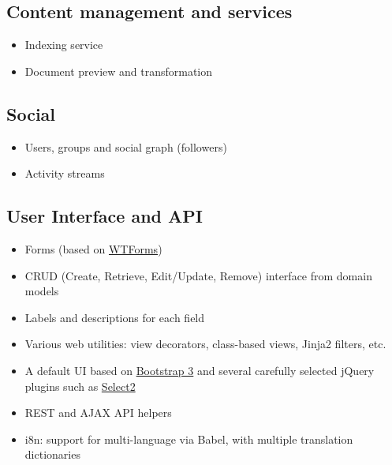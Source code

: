 \documentclass[a4paper,12pt,english]{sphinxmanual}
\begin{document}
\subsection{Content management and services}
\label{introduction:content-management-and-services}\begin{itemize}
\item {} 
Indexing service

\item {} 
Document preview and transformation

\end{itemize}


\subsection{Social}
\label{introduction:social}\begin{itemize}
\item {} 
Users, groups and social graph (followers)

\item {} 
Activity streams

\end{itemize}


\subsection{User Interface and API}
\label{introduction:user-interface-and-api}\begin{itemize}
\item {} 
Forms (based on \href{http://wtforms.simplecodes.com/}{WTForms})

\item {} 
CRUD (Create, Retrieve, Edit/Update, Remove) interface from domain
models

\item {} 
Labels and descriptions for each field

\item {} 
Various web utilities: view decorators, class-based views, Jinja2
filters, etc.

\item {} 
A default UI based on \href{http://getbootstrap.com/}{Bootstrap 3} and
several carefully selected jQuery plugins such as
\href{http://ivaynberg.github.io/select2/}{Select2}

\item {} 
REST and AJAX API helpers

\item {} 
i8n: support for multi-language via Babel, with multiple translation
dictionaries

\end{itemize}
\end{document}
